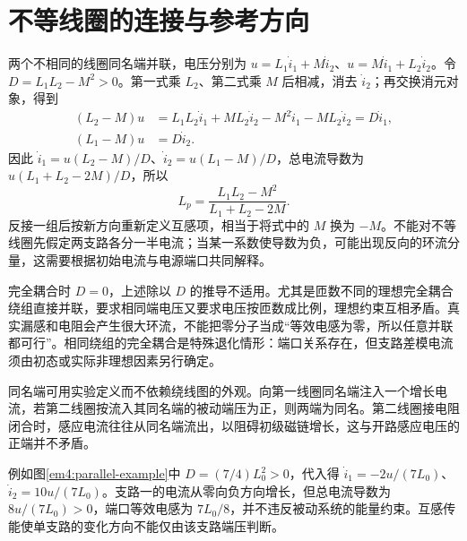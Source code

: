\section{不等线圈的连接与参考方向}

两个不相同的线圈同名端并联，电压分别为 $u=L_1\dot i_1+M\dot i_2$、$u=M\dot i_1+L_2\dot i_2$。令 $D=L_1L_2-M^2>0$。第一式乘 $L_2$、第二式乘 $M$ 后相减，消去 $\dot i_2$；再交换消元对象，得到
\[
 \begin{aligned}
 (L_2-M)u&=L_1L_2\dot i_1+ML_2\dot i_2
              -M^2\dot i_1-ML_2\dot i_2=D\dot i_1,\\
 (L_1-M)u&=D\dot i_2.
 \end{aligned}
\]
因此 $\dot i_1=u(L_2-M)/D$、$\dot i_2=u(L_1-M)/D$，总电流导数为 $u(L_1+L_2-2M)/D$，所以
\[L_p=\frac{L_1L_2-M^2}{L_1+L_2-2M}.\]
反接一组后按新方向重新定义互感项，相当于将式中的 $M$ 换为 $-M$。不能对不等线圈先假定两支路各分一半电流；当某一系数使导数为负，可能出现反向的环流分量，这需要根据初始电流与电源端口共同解释。

完全耦合时 $D=0$，上述除以 $D$ 的推导不适用。尤其是匝数不同的理想完全耦合绕组直接并联，要求相同端电压又要求电压按匝数成比例，理想约束互相矛盾。真实漏感和电阻会产生很大环流，不能把零分子当成“等效电感为零，所以任意并联都可行”。相同绕组的完全耦合是特殊退化情形：端口关系存在，但支路差模电流须由初态或实际非理想因素另行确定。

同名端可用实验定义而不依赖绕线图的外观。向第一线圈同名端注入一个增长电流，若第二线圈按流入其同名端的被动端压为正，则两端为同名。第二线圈接电阻闭合时，感应电流往往从同名端流出，以阻碍初级磁链增长，这与开路感应电压的正端并不矛盾。


例如图\ref{em4:parallel-example}中 $D=(7/4)L_0^2>0$，代入得 $\dot i_1=-2u/(7L_0)$、$\dot i_2=10u/(7L_0)$。支路一的电流从零向负方向增长，但总电流导数为 $8u/(7L_0)>0$，端口等效电感为 $7L_0/8$，并不违反被动系统的能量约束。互感传能使单支路的变化方向不能仅由该支路端压判断。

